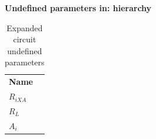 {\textbf{Undefined parameters in: hierarchy}}

\begin{table}[h]
\centering
\begin{tabular}[c]{l}
\textbf{Name} \\ 
\rowcolor{myyellow}
$R_{i XA}$ \\ 
$R_{L}$ \\ 
\rowcolor{myyellow}
$A_{i}$ \\ 
\end{tabular}
\caption{Expanded circuit undefined parameters}
\end{table}

